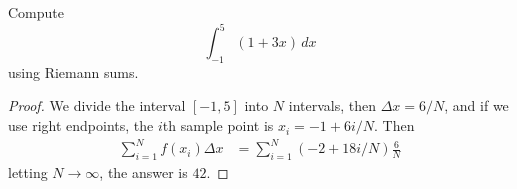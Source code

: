 \documentclass[openany]{book}
\begin{document}
\begin{prob}
    Compute
    \[
    \int_{-1}^{5} (1+3x)\,dx
    \]
    using Riemann sums.
\end{prob}
\begin{proof}
    We divide the interval $[-1, 5]$ into $N$ intervals, then $\Delta x=6/N$, and if we use right endpoints, the $i$th sample point is $x_i=-1+6i/N$. Then 
    \begin{align*}
        \sum_{i=1}^Nf(x_i)\Delta x&=\sum_{i=1}^N(-2+18i/N)\frac{6}{N}
    \end{align*}
    letting $N\to\infty$, the answer is $42$.
\end{proof}




\end{document}
